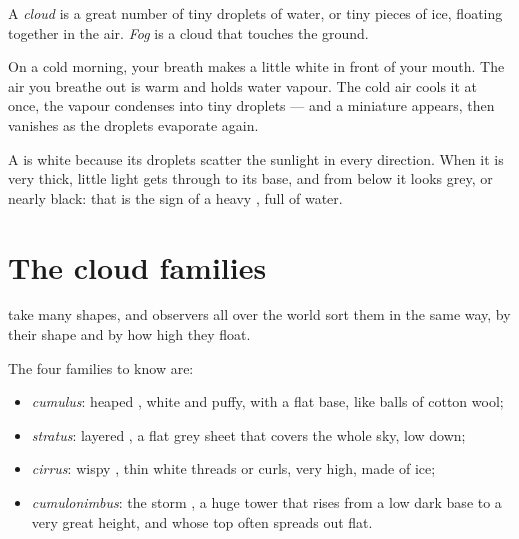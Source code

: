 \begin{definition}\label{def:g4:clouds-rain-snow:cloud}
A \emph{cloud} is a great number of tiny droplets of water,
or tiny pieces of ice, floating together in the air. \emph{Fog}
is a cloud that touches the ground.
\end{definition}

\begin{example}\label{ex:g4:clouds-rain-snow:breath}
On a cold morning, your breath makes a little white  in front of your
mouth. The air you breathe out is warm and holds water vapour. The cold air
cools it at once, the vapour condenses into tiny droplets --- and a
miniature  appears, then vanishes as the droplets evaporate again.
\end{example}

A  is white because its droplets scatter the sunlight in every
direction. When it is very thick, little light gets through to its base,
and from below it looks grey, or nearly black: that is the sign of a heavy
, full of water.

\section{The cloud families}

 take many shapes, and  observers all over the world sort
them in the same way, by their shape and by how high they float.

\begin{definition}\label{def:g4:clouds-rain-snow:cloud-families}
The four  families to know are:
\begin{itemize}
  \item \emph{cumulus}: heaped , white and puffy, with
        a flat base, like balls of cotton wool;
  \item \emph{stratus}: layered , a flat grey sheet
        that covers the whole sky, low down;
  \item \emph{cirrus}: wispy , thin white threads or
        curls, very high, made of ice;
  \item \emph{cumulonimbus}: the storm , a huge
        tower that rises from a low dark base to a very great height, and
        whose top often spreads out flat.
\end{itemize}
\end{definition}

